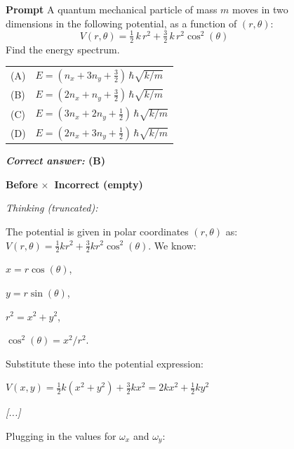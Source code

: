 \begin{figure}[t]
\scriptsize
\begin{mdframed}[style=promptbox]
\noindent\textbf{Prompt}
\vspace{2pt}\noindent
A quantum mechanical particle of mass $m$ moves in two dimensions in the following potential, as a function of $(r, \theta)$:
%
\[
V(r, \theta) = \tfrac{1}{2}\,k\,r^2 + \tfrac{3}{2}\,k\,r^2\cos^2(\theta)
\]
%
Find the energy spectrum.

\vspace{2pt}
\noindent
\begin{tabular}{@{}ll@{}}
(A) & $E = (n_x + 3n_y + \tfrac{3}{2})\,\hbar\sqrt{k/m}$ \\[2pt]
(B) & $E = (2n_x + n_y + \tfrac{3}{2})\,\hbar\sqrt{k/m}$ \\[2pt]
(C) & $E = (3n_x + 2n_y + \tfrac{1}{2})\,\hbar\sqrt{k/m}$ \\[2pt]
(D) & $E = (2n_x + 3n_y + \tfrac{1}{2})\,\hbar\sqrt{k/m}$
\end{tabular}

\hfill\textbf{\textit{Correct answer:} (B)}
\end{mdframed}
\vspace{2pt}
\noindent
\begin{minipage}[t]{0.49\textwidth}
\begin{mdframed}[style=beforebox]
\noindent\textbf{Before \sdrlfootnotesize} \hfill {\colorbox{beforebg}{\textcolor{beforeframe}{\textbf{$\boldsymbol\times$~Incorrect (empty)}}}}

\noindent\textit{Thinking (truncated):}
\begin{mdframed}[style=thinkbox]
The potential is given in polar coordinates $(r, \theta)$ as:
$V(r, \theta) = \frac{1}{2}kr^2 + \frac{3}{2}kr^2\cos^2(\theta)$.
We know:

\quad $x = r\cos(\theta)$,

\quad $y = r\sin(\theta)$,

\quad $r^2 = x^2 + y^2$,

\quad $\cos^2(\theta) = x^2/r^2$.

\smallskip
Substitute these into the potential expression:

\quad $V(x,y) = \frac{1}{2}k(x^2+y^2) + \frac{3}{2}kx^2 = 2kx^2 + \frac{1}{2}ky^2$

\textit{[...]}

Plugging in the values for $\omega_x$ and $\omega_y$:


\end{mdframed}
\end{mdframed}
\end{minipage}
\end{figure}
